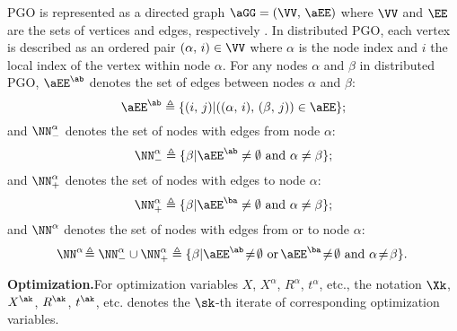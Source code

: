 \quad  PGO is represented as a directed graph $\aGG=(\VV,\,\aEE)$ where $\VV$ and $\EE$ are the sets of vertices and edges, respectively \cite{rosen2016se}. In distributed PGO, each vertex is described as  an ordered pair $(\alpha,\,i)\in\VV$ where $\alpha$ is the node index and $i$ the local index of the vertex within node $\alpha$. For any  nodes $\alpha$ and $\beta$ in distributed PGO, $\aEE^{\ab}$ denotes the set of edges between nodes $\alpha$ and $\beta$: 
\vspace{-0.15em}
\begin{equation}\label{eq::aEE}
	\aEE^{\ab}\triangleq\{(i,\,j)|((\alpha,\,i),\,(\beta,\,j))\in\aEE\};
\vspace{-0.15em}
\end{equation} 
and $\NN_-^\alpha$  denotes the set of nodes with edges from node $\alpha$:
\vspace{-0.15em}
\begin{equation}\label{eq::NN-}
	\NN_-^\alpha\triangleq\{\beta|\aEE^{\ab}\neq \emptyset\text{ and }\alpha\neq\beta\};
\vspace{-0.15em}
\end{equation} 
and $\NN_+^\alpha$ denotes  the set of nodes with edges to node $\alpha$:
\vspace{-0.15em}
\begin{equation}\label{eq::NN+}
	\NN_+^\alpha\triangleq\{\beta|\aEE^{\ba}\neq \emptyset\text{ and }\alpha\neq\beta\};
\vspace{-0.15em}
\end{equation} 
and $\NN^\alpha$ denotes the set of nodes with edges  from or to node $\alpha$:
\vspace{-0.15em}
\begin{equation}\label{eq::NN}
\!	\NN^\alpha\!\triangleq \NN_-^\alpha \cup \NN_+^\alpha \triangleq \{\beta|\aEE^{\ab}\!\neq\! \emptyset\text{ or }\! \aEE^{\ba}\!\neq\! \emptyset\text{ and }\alpha \!\neq\! \beta\}. 
\vspace{-0.1em}
\end{equation}

\textbf{Optimization.}\quad For optimization variables $X$, $X^\alpha$, $R^\alpha$, $t^\alpha$, etc., the notation $\Xk$, $X^{\ak}$, $R^{\ak}$, $t^{\ak}$, etc. denotes the $\sk$-th iterate of corresponding optimization variables.